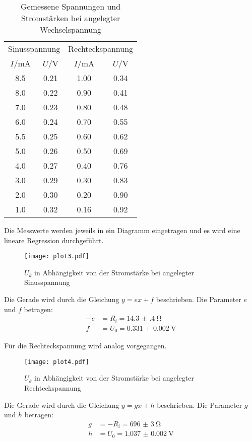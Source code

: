 \begin{table}[H]
  \centering
  \caption{Gemessene Spannungen und Stromstärken bei angelegter Wechselspannung}
  \label{tab:wechselspannung}
  \begin{tabular}{c c c c}
    \toprule
    \multicolumn{2}{c}{Sinusspannung} & \multicolumn{2}{c}{Rechteckspannung} \\
    \cmidrule(lr){1-2}\cmidrule(lr){3-4}
    $I/$mA & $U/$V & $I/$mA & $U/$V \\
    \midrule
    8.5  &  0.21  &  1.00  &   0.34 \\
    8.0  &  0.22  &  0.90  &   0.41 \\
    7.0  &  0.23  &  0.80  &   0.48 \\
    6.0  &  0.24  &  0.70  &   0.55 \\
    5.5  &  0.25  &  0.60  &   0.62 \\
    5.0  &  0.26  &  0.50  &   0.69 \\
    4.0  &  0.27  &  0.40  &   0.76 \\
    3.0  &  0.29  &  0.30  &   0.83 \\
    2.0  &  0.30  &  0.20  &   0.90 \\
    1.0  &  0.32  &  0.16  &   0.92 \\
    \bottomrule
  \end{tabular}
\end{table}

Die Messwerte werden jeweils in ein Diagramm eingetragen und es wird eine lineare Regression durchgeführt.

\begin{figure}[H]
  \centering
  \texttt{[image: plot3.pdf]}
  \caption{$U_k$ in Abhängigkeit von der Stromstärke bei angelegter Sinusspannung}
  \label{fig:plot3}
\end{figure}

Die Gerade wird durch die Gleichung $y = ex + f$ beschrieben. Die Parameter $e$ und $f$ betragen:
\begin{align*}
  -e &= R_i = \SI{14.3(4)}{\ohm} \\
  f &= U_0 = \SI{0.331(2)}{\volt}
\end{align*}

Für die Rechteckspannung wird analog vorgegangen.

\begin{figure}[H]
  \centering
  \texttt{[image: plot4.pdf]}
  \caption{$U_k$ in Abhängigkeit von der Stromstärke bei angelegter Rechteckspannung}
  \label{fig:plot4}
\end{figure}

Die Gerade wird durch die Gleichung $y = gx + h$ beschrieben. Die Parameter $g$ und $h$ betragen:
\begin{align*}
  g &= -R_i = \SI{696(3)}{\ohm}   \\
  h &= U_0 = \SI{1.037(2)}{\volt}
\end{align*}
